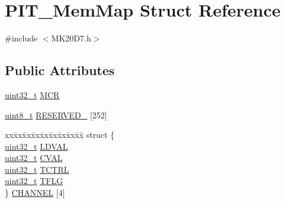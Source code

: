 \hypertarget{struct_p_i_t___mem_map}{}\section{P\+I\+T\+\_\+\+Mem\+Map Struct Reference}
\label{struct_p_i_t___mem_map}


{\ttfamily \#include $<$M\+K20\+D7.\+h$>$}

\subsection*{Public Attributes}
\begin{DoxyCompactItemize}
\item 
\hyperlink{_p_e___types_8h_a33594304e786b158f3fb30289278f5af}{uint32\+\_\+t} \hyperlink{struct_p_i_t___mem_map_a99390c5764693e07c37d40ead441a7a4}{M\+CR}
\item 
\hyperlink{_p_e___types_8h_aba7bc1797add20fe3efdf37ced1182c5}{uint8\+\_\+t} \hyperlink{struct_p_i_t___mem_map_ae4fc0749ddebd75252cc2b7b1dab3b91}{R\+E\+S\+E\+R\+V\+E\+D\+\_} \mbox{[}252\mbox{]}
\item 
\begin{tabbing}
xx\=xx\=xx\=xx\=xx\=xx\=xx\=xx\=xx\=\kill
struct \{\\
\>\hyperlink{_p_e___types_8h_a33594304e786b158f3fb30289278f5af}{uint32\_t} \hyperlink{struct_p_i_t___mem_map_ad664bbe0f8b53ee1e533727db4da3fb2}{LDVAL}\\
\>\hyperlink{_p_e___types_8h_a33594304e786b158f3fb30289278f5af}{uint32\_t} \hyperlink{struct_p_i_t___mem_map_a7d3d1a5913a28cfb4ca0e120ebf37087}{CVAL}\\
\>\hyperlink{_p_e___types_8h_a33594304e786b158f3fb30289278f5af}{uint32\_t} \hyperlink{struct_p_i_t___mem_map_a567cdea5c7d615341f95f1438020a7e1}{TCTRL}\\
\>\hyperlink{_p_e___types_8h_a33594304e786b158f3fb30289278f5af}{uint32\_t} \hyperlink{struct_p_i_t___mem_map_add88e740d4ec7a83e66cf9ad79cd027a}{TFLG}\\
\} \hyperlink{struct_p_i_t___mem_map_aa7a105b8dca38d6f5e0e51d796012bca}{CHANNEL} \mbox{[}4\mbox{]}\\


\end{tabbing}
\end{DoxyCompactItemize}
